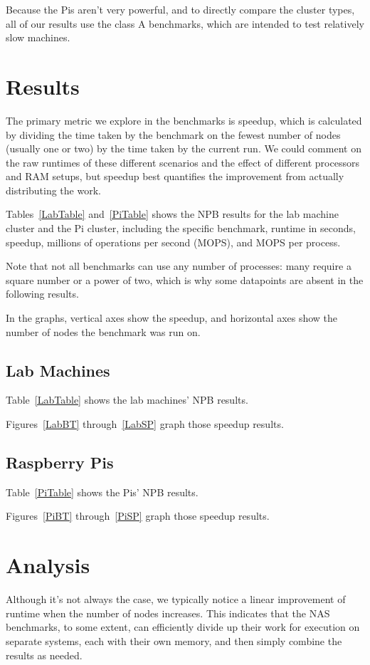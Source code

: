 \documentclass{acm_proc_article-sp}
\begin{document}
Because the Pis aren't very powerful, and to directly compare the cluster types, all of our results use the class A benchmarks, which are intended to test relatively slow machines.

\section{Results}
The primary metric we explore in the benchmarks is speedup, which is calculated by dividing the time taken by the benchmark on the fewest number of nodes (usually one or two) by the time taken by the current run. We could comment on the raw runtimes of these different scenarios and the effect of different processors and RAM setups, but speedup best quantifies the improvement from actually distributing the work.

Tables~\ref{LabTable} and~\ref{PiTable} shows the NPB results for the lab machine cluster and the Pi cluster, including the specific benchmark, runtime in seconds, speedup, millions of operations per second (MOPS), and MOPS per process.

Note that not all benchmarks can use any number of processes: many require a square number or a power of two, which  is why some datapoints are absent in the following results.

In the graphs, vertical axes show the speedup, and horizontal axes show the number of nodes the benchmark was run on.

\subsection{Lab Machines}

Table~\ref{LabTable} shows the lab machines' NPB results.

Figures~\ref{LabBT} through~\ref{LabSP} graph those speedup results.

\subsection{Raspberry Pis}

Table~\ref{PiTable} shows the Pis' NPB results.

Figures~\ref{PiBT} through~\ref{PiSP} graph those speedup results.

\section{Analysis}
Although it's not always the case, we typically notice a linear improvement of runtime when the number of nodes increases. This indicates that the NAS benchmarks, to some extent, can efficiently divide up their work for execution on separate systems, each with their own memory, and then simply combine the results as needed.
\end{document}
